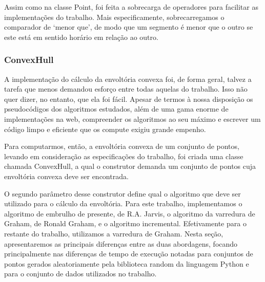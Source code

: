 \documentclass{article}
\begin{document}
Assim como na classe Point, foi feita a sobrecarga de operadores para facilitar as implementações do trabalho. Mais especificamente, sobrecarregamos o comparador de ‘menor que’, de modo que um segmento é menor que o outro se este está em sentido horário em relação ao outro.

\subsubsection{ConvexHull}

A implementação do cálculo da envoltória convexa foi, de forma geral, talvez a tarefa que menos demandou esforço entre todas aquelas do trabalho. Isso não quer dizer, no entanto, que ela foi fácil. Apesar de termos à nossa disposição os pseudocódigos dos algoritmos estudados, além de uma gama enorme de implementações na web, compreender os algoritmos ao seu máximo e escrever um código limpo e eficiente que os compute exigiu grande empenho.

Para computarmos, então, a envoltória convexa de um conjunto de pontos, levando em consideração as especificações do trabalho, foi criada uma classe chamada ConvexHull, a qual o construtor demanda um conjunto de pontos cuja envoltória convexa deve ser encontrada. 

O segundo parâmetro desse construtor define qual o algoritmo que deve ser utilizado para o cálculo da envoltória. Para este trabalho, implementamos o algoritmo de embrulho de presente, de R.A. Jarvis, o algoritmo da varredura de Graham, de Ronald Graham, e o algoritmo incremental. Efetivamente para o restante do trabalho, utilizamos a varredura de Graham. Nesta seção, apresentaremos as principais diferenças entre as duas abordagens, focando principalmente nas diferenças de tempo de execução notadas para conjuntos de pontos gerados aleatoriamente pela biblioteca random da linguagem Python e para o conjunto de dados utilizados no trabalho.
\end{document}
